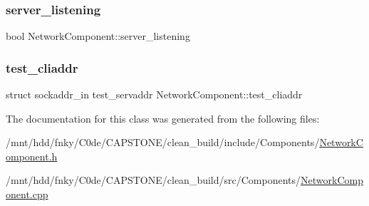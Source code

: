 \subsubsection{\texorpdfstring{server\+\_\+listening}{server\_listening}}
{\footnotesize\ttfamily bool Network\+Component\+::server\+\_\+listening\hspace{0.3cm}{\ttfamily [private]}}

\mbox{\label{classNetworkComponent_ab8876db02b0915f6f7cc5e31eee6e84b}} 
\subsubsection{\texorpdfstring{test\+\_\+cliaddr}{test\_cliaddr}}
{\footnotesize\ttfamily struct sockaddr\+\_\+in test\+\_\+servaddr Network\+Component\+::test\+\_\+cliaddr\hspace{0.3cm}{\ttfamily [private]}}



The documentation for this class was generated from the following files\+:\begin{DoxyCompactItemize}
\item 
/mnt/hdd/fnky/\+C0de/\+C\+A\+P\+S\+T\+O\+N\+E/clean\+\_\+build/include/\+Components/\hyperlink{NetworkComponent_8h}{Network\+Component.\+h}\item 
/mnt/hdd/fnky/\+C0de/\+C\+A\+P\+S\+T\+O\+N\+E/clean\+\_\+build/src/\+Components/\hyperlink{NetworkComponent_8cpp}{Network\+Component.\+cpp}\end{DoxyCompactItemize}
